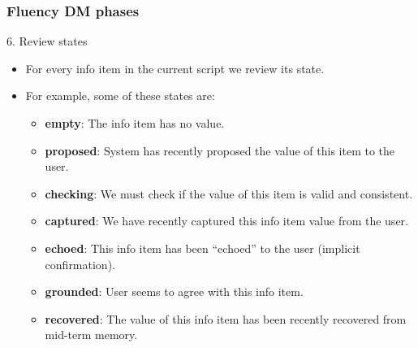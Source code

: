 \documentclass[11pt]{beamer}
\begin{document}
\begin{frame}[fragile]
\frametitle{Fluency DM phases}
	\begin{block}{6. Review states}
	\begin{itemize}
		\item For every info item in the current script we review its state.
		\item For example, some of these states are:
		\begin{itemize}
				\item \textbf{empty}: The info item has no value.
				\item \textbf{proposed}: System has recently proposed the value of this item to the user.
				\item \textbf{checking}: We must check if the value of this item is valid and consistent.
				\item \textbf{captured}: We have recently captured this info item value from the user.
				\item \textbf{echoed}: This info item has been ``echoed'' to the user (implicit confirmation).
				\item \textbf{grounded}: User seems to agree with this info item.
				\item \textbf{recovered}: The value of this info item has been recently recovered from mid-term memory.
		\end{itemize}
	\end{itemize}
	\end{block}
\end{frame}
\end{document}
